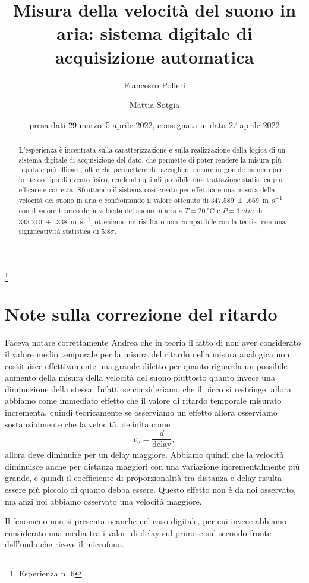 \documentclass[fleqn, varvw]{memo}
\begin{document}
\title{
    Misura della velocità del suono in aria: sistema digitale di acquisizione automatica
}
\thanks{Esperienza n. 6
}

\author{Francesco Polleri}
\author{Mattia Sotgia}


\date{presa dati
    29 marzo--5 aprile 2022, consegnata in data
    27 aprile 2022
}
\revised{\today}

\begin{abstract}
    L'esperienza è incentrata sulla caratterizzazione e sulla realizzazione della logica di un sistema digitale di acquisizione del dato, che permette di poter rendere la misura più rapida e più efficace, oltre che permettere di raccogliere misure in grande numero per lo stesso tipo di evento fisico, rendendo quindi possibile una trattazione statistica più efficace e corretta. Sfruttando il sistema così creato per effettuare una misura della velocità del suono in aria e confrontando il valore ottenuto di \SI{347.589(669)}{\metre\per\second} con il valore teorico della velocità del suono in aria a $T=\SI{20}{\celsius}$ e $P=\SI{1}{atm}$ di \SI{343.210(338)}{\metre\per\second}, otteniamo un risultato non compatibile con la teoria, con una significatività statistica di $5.8\sigma$.
\end{abstract}

\maketitle


\section{Note sulla correzione del ritardo}

Faceva notare correttamente Andrea che in teoria il fatto di non aver considerato il valore medio temporale per la misura del ritardo nella misura analogica non costituisce effettivamente una grande difetto per quanto riguarda un possibile aumento della misura della velocità del suono piuttosto quanto invece una diminuzione della stessa. Infatti se consideriamo che il picco si restringe, allora abbiamo come immediato effetto che il valore di ritardo temporale misurato incrementa, quindi teoricamente se osserviamo un effetto allora osserviamo sostanzialmente che la velocità, definita come \[v_s = \frac{d}{\text{delay}}, \] allora deve diminuire per un delay maggiore. Abbiamo quindi che la velocità diminuisce anche per distanza maggiori con una variazione incrementalmente più grande, e quindi il coefficiente di proporzionalità tra distanza e delay risulta essere più piccolo di quanto debba essere. Questo effetto non è da noi osservato, ma anzi noi abbiamo osservato una velocità maggiore.
 
Il fenomeno non si presenta neanche nel caso digitale, per cui invece abbiamo considerato una media tra i valori di delay sul primo e sul secondo fronte dell'onda che riceve il microfono.  
\end{document}
